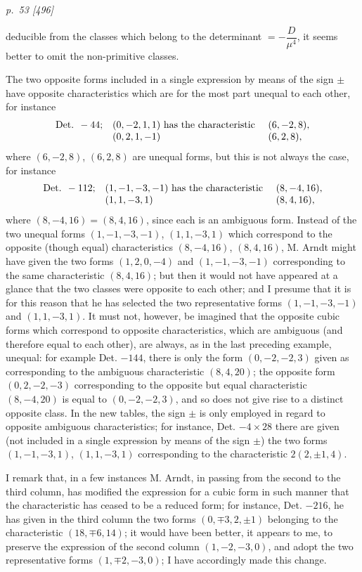 ﻿\documentclass[11pt,a4paper]{article}
\theoremstyle{plain}
\theoremstyle{definition}
\begin{document}
\clearpage
\textit{p.~53 [496]}

deducible from the classes which belong to the determinant
\(=-\dfrac{D}{\mu^4}\), it seems better to omit the non-primitive classes.

The two opposite forms included in a single expression by means of the sign
\(\pm\) have opposite characteristics which are for the most part unequal
to each other, for instance
\[
\begin{array}{r@{\quad}l@{\quad}l}
\text{Det. }-44;&(0,-2,1,1)\hbox{ has the characteristic }&(6,-2,8),\\
&(0,2,1,-1)&(6,2,8),
\end{array}
\]
where \((6,-2,8)\), \((6,2,8)\) are unequal forms, but this is not always
the case, for instance
\[
\begin{array}{r@{\quad}l@{\quad}l}
\text{Det. }-112;&(1,-1,-3,-1)\hbox{ has the characteristic }&(8,-4,16),\\
&(1,1,-3,1)&(8,4,16),
\end{array}
\]
where \((8,-4,16)=(8,4,16)\), since each is an ambiguous form. Instead of
the two unequal forms \((1,-1,-3,-1)\), \((1,1,-3,1)\) which correspond to
the opposite (though equal) characteristics \((8,-4,16)\), \((8,4,16)\),
M. Arndt might have given the two forms \((1,2,0,-4)\) and
\((1,-1,-3,-1)\) corresponding to the same characteristic \((8,4,16)\);
but then it would not have appeared at a glance that the two classes were
opposite to each other; and I presume that it is for this reason that he
has selected the two representative forms \((1,-1,-3,-1)\) and
\((1,1,-3,1)\). It must not, however, be imagined that the opposite cubic
forms which correspond to opposite characteristics, which are ambiguous
(and therefore equal to each other), are always, as in the last preceding
example, unequal: for example Det. \(-144\), there is only the form
\((0,-2,-2,3)\) given as corresponding to the ambiguous characteristic
\((8,4,20)\); the opposite form \((0,2,-2,-3)\) corresponding to the
opposite but equal characteristic \((8,-4,20)\) is equal to
\((0,-2,-2,3)\), and so does not give rise to a distinct opposite class.
In the new tables, the sign \(\pm\) is only employed in regard to opposite
ambiguous characteristics; for instance, Det. \(-4\times28\) there are
given (not included in a single expression by means of the sign \(\pm\))
the two forms \((1,-1,-3,1)\), \((1,1,-3,1)\) corresponding to the
characteristic \(2(2,\pm1,4)\).

I remark that, in a few instances M. Arndt, in passing from the second to
the third column, has modified the expression for a cubic form in such
manner that the characteristic has ceased to be a reduced form; for
instance, Det. \(-216\), he has given in the third column the two forms
\((0,\mp3,2,\pm1)\) belonging to the characteristic \((18,\mp6,14)\); it
would have been better, it appears to me, to preserve the expression of the
second column \((1,-2,-3,0)\), and adopt the two representative forms
\((1,\mp2,-3,0)\); I have accordingly made this change.
\end{document}
